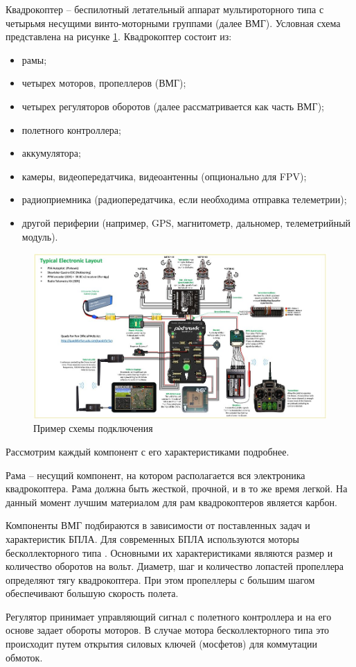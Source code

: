 Квадрокоптер -- беспилотный летательный аппарат мультироторного типа с четырьмя несущими винто-моторными группами (далее ВМГ). Условная схема представлена на рисунке \ref{fig:pix}.
Квадрокоптер состоит из:
\begin{itemize}
	\item рамы;
	\item четырех моторов, пропеллеров (ВМГ);
	\item четырех регуляторов оборотов (далее рассматривается как часть ВМГ);
	\item полетного контроллера;
	\item аккумулятора;
	\item камеры, видеопередатчика, видеоантенны (опционально для FPV);
	\item радиоприемника (радиопередатчика, если необходима отправка телеметрии);
	\item другой периферии (например, GPS, магнитометр, дальномер, телеметрийный модуль).
\end{itemize}

 \begin{figure}[H]
 	\centering
 	\includegraphics[width=0.5\linewidth]{../RW/pics/pix}
 	\caption{Пример схемы подключения \cite{px4}
 	}
 	\label{fig:pix}
 \end{figure}

Рассмотрим каждый компонент с его характеристиками подробнее.

Рама -- несущий компонент, на котором располагается вся электроника квадрокоптера. Рама должна быть жесткой, прочной, и в то же время легкой. На данный момент лучшим материалом для рам квадрокоптеров является карбон.

Компоненты ВМГ подбираются в зависимости от поставленных задач и характеристик БПЛА. Для современных БПЛА используются моторы бесколлекторного типа \cite{motors}. Основными их характеристиками являются размер и количество оборотов на вольт.
Диаметр, шаг и количество лопастей пропеллера определяют тягу квадрокоптера. При этом пропеллеры с большим шагом обеспечивают большую скорость полета.

Регулятор принимает управляющий сигнал с полетного контроллера и на его основе задает обороты моторов. В случае мотора бесколлекторного типа это происходит путем открытия силовых ключей (мосфетов) для коммутации обмоток.

